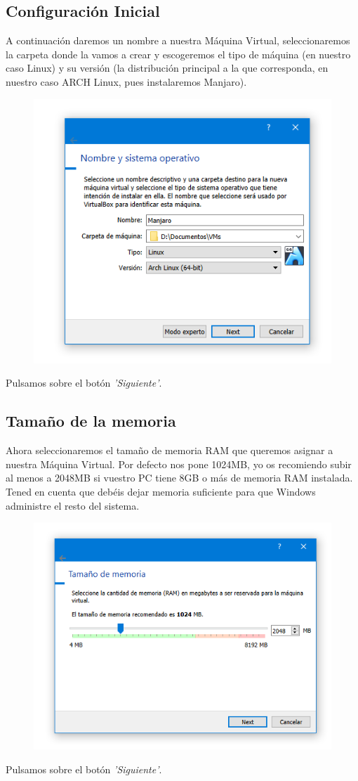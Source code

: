\subsection{Configuración Inicial}
\noindent
A continuación daremos un nombre a nuestra Máquina Virtual, seleccionaremos la carpeta donde la vamos a crear y escogeremos el tipo de máquina (en nuestro caso Linux) y su versión (la distribución principal a la que corresponda, en nuestro caso ARCH Linux, pues instalaremos Manjaro).
    \begin{figure}[H]
        \centering
        \includegraphics[width= 0.7 \textwidth]{Media/VB2.png}
    \end{figure}
\newline \noindent Pulsamos sobre el botón \textit{'Siguiente'}.

\subsection{Tamaño de la memoria}
\noindent
Ahora seleccionaremos el tamaño de memoria RAM que queremos asignar a nuestra Máquina Virtual. Por defecto nos pone 1024MB, yo os recomiendo subir al menos a 2048MB si vuestro PC tiene 8GB o más de memoria RAM instalada. Tened en cuenta que debéis dejar memoria suficiente para que Windows administre el resto del sistema.
    \begin{figure}[H]
        \centering
        \includegraphics[width= 0.7 \textwidth]{Media/VB3.png}
    \end{figure}
\newline \noindent Pulsamos sobre el botón \textit{'Siguiente'}.

